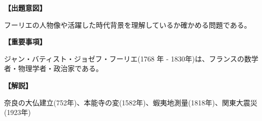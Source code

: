 \noindent \textbf{【出題意図】}

\noindent フーリエの人物像や活躍した時代背景を理解しているか確かめる問題である。

\vspace{1em}
\noindent \textbf{【重要事項】}

ジャン・バティスト・ジョゼフ・フーリエ(1768 年 - 1830年)は、フランスの数学者・物理学者・政治家である。

\vspace{1em}
\noindent \textbf{【解説】}

\noindent 奈良の大仏建立(752年)、本能寺の変(1582年)、蝦夷地測量(1818年)、関東大震災(1923年)　
